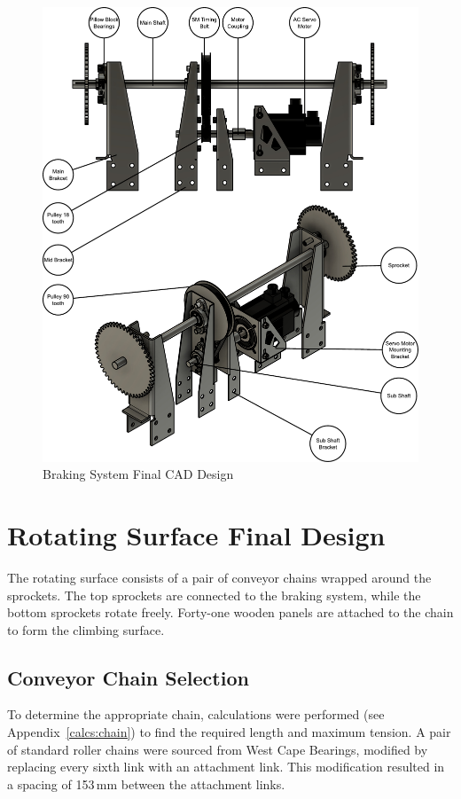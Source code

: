 \begin{figure}[H]
    \centering
    \includegraphics[width=0.8\linewidth]{figs/final_design/BrakingSyst.pdf}
    \caption{Braking System Final CAD Design}
    \label{fig:brake-system-final-design}
\end{figure}

\section{Rotating Surface Final Design}
The rotating surface consists of a pair of conveyor chains wrapped around the sprockets. The top sprockets are connected to the braking system, while the bottom sprockets rotate freely. Forty-one wooden panels are attached to the chain to form the climbing surface.

\subsection{Conveyor Chain Selection}
To determine the appropriate chain, calculations were performed (see Appendix~\ref{calcs:chain}) to find the required length and maximum tension. A pair of standard roller chains were sourced from West Cape Bearings, modified by replacing every sixth link with an attachment link. This modification resulted in a spacing of 153\,mm between the attachment links.

